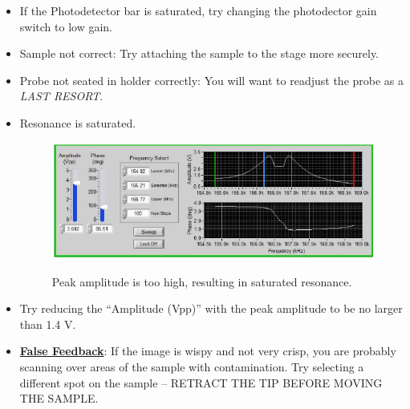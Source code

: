 \documentclass{../lab}
\begin{document}
\begin{itemize}
    \item If the Photodetector bar is saturated, try changing the photodector gain switch to low gain.

    \item Sample not correct: Try attaching the sample to the stage more securely.

    \item Probe not seated in holder correctly:  You will want to readjust the probe as a \emph{LAST RESORT}.
    
    \item Resonance is saturated.

    \begin{figure}[H]
        \centering
        \href{http://experimentationlab.berkeley.edu/sites/default/files/AFMImages/54.png}{\includegraphics[width=0.7\linewidth]{images/54.png}}
        \caption{Peak amplitude is too high, resulting in saturated resonance.}
    \end{figure}

    \item Try reducing the ``Amplitude (Vpp)'' with the peak amplitude to be no larger than 1.4 V.

    \item \href{http://experimentationlab.berkeley.edu/sites/default/files/AFMImages/VM\%204.2.\%20On\%20Cont-small\%20vib\_converted\_r1.mp4}{\textbf{False Feedback}}:  If the image is wispy and not very crisp, you are probably scanning over areas of the sample with contamination.  Try selecting a different spot on the sample -- RETRACT THE TIP BEFORE MOVING THE SAMPLE.
\end{itemize}
\end{document}
